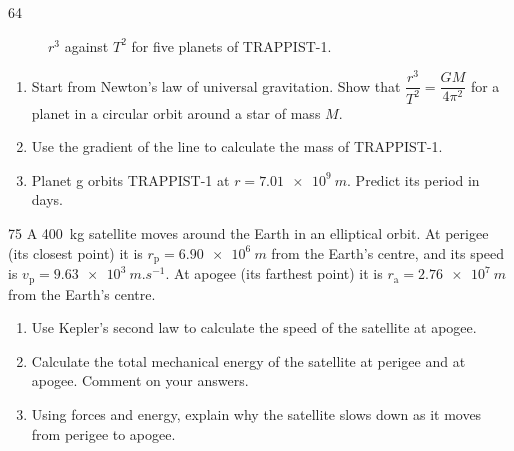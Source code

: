 \begin{practiceq}{6}{4}
\begin{figure}
  \caption*{$r^3$ against $T^2$ for five planets of TRAPPIST-1.}
\end{figure}
\begin{enumerate}[label=(\alph*)]
  \item Start from Newton's law of universal gravitation. Show that
        $\dfrac{r^3}{T^2} = \dfrac{GM}{4\pi^2}$ for a planet in a circular orbit around a star
        of mass $M$. 
  \item Use the gradient of the line to calculate the mass of TRAPPIST-1.
  \item Planet g orbits TRAPPIST-1 at $r = \qty{7.01e9}{m}$. Predict its period in days.
\end{enumerate}
\end{practiceq}

\begin{practiceq}{7}{5}\label{pq:ellipse}
A \qty{400}{kg} satellite moves around the Earth in an elliptical orbit. At perigee (its
closest point) it is $r_\mathrm{p} = \qty{6.90e6}{m}$ from the Earth's centre, and its speed is
$v_\mathrm{p} = \qty{9.63e3}{m.s^{-1}}$. At apogee (its farthest point) it is
$r_\mathrm{a} = \qty{2.76e7}{m}$ from the Earth's centre.
\begin{enumerate}[label=(\alph*)]
  \item Use Kepler's second law to calculate the speed of the satellite at apogee.
  \item Calculate the total mechanical energy of the satellite at perigee and at apogee.
        Comment on your answers. 
  \item Using forces and energy, explain why the satellite slows down as it moves from
        perigee to apogee. 
\end{enumerate}
\end{practiceq}
